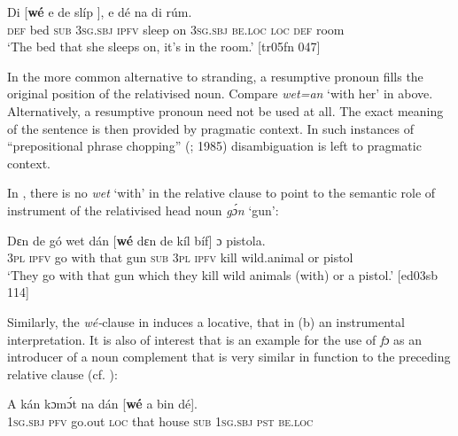 \ea%
    \label{ex:key:1437}
    \gll Di    [\textbf{wé}  e    de  slíp    ],  e    dé    na  di  rúm.\\
\textsc{def} bed \textsc{sub} \textsc{3sg.sbj}  \textsc{ipfv} sleep  on  \textsc{3sg.sbj}  \textsc{be.loc}  \textsc{loc}  \textsc{def}  room\\

\glt ‘The bed that she sleeps on, it’s in the room.’ [tr05fn 047]
\z

In the more common alternative to stranding, a resumptive pronoun fills the original position of the relativised noun. Compare \textit{wet=an} ‘with her’ in  above. Alternatively, a resumptive pronoun need not be used at all. The exact meaning of the sentence is then provided by pragmatic context. In such instances of “prepositional phrase chopping” (\citealt{Tarallo1983}; 1985) disambiguation is left to pragmatic context. 


In , there is no \textit{wet} ‘with’ in the relative clause to point to the semantic role of instrument of the relativised head noun \textit{gɔ́n} ‘gun’:



\ea%
    \label{ex:key:1438}
    \gll Dɛn  de  gó  wet    dán      [\textbf{wé}  dɛn  de  kíl  bíf]      ɔ  pistola.\\
\textsc{3pl}  \textsc{ipfv}  go  with    that    gun   \textsc{sub}  \textsc{3pl}  \textsc{ipfv}  kill  wild.animal  or  pistol\\

\glt ‘They go with that gun which they kill wild animals (with) or a pistol.’ [ed03sb 114]
\z

Similarly, the \textit{wé-}clause in  induces a locative, that in (b) an instrumental interpretation. It is also of interest that  is an example for the use of \textit{fɔ} as an introducer of a noun complement that is very similar in function to the preceding relative clause (cf. ): 


\ea%
    \label{ex:key:1439}
    \gll A    kán  kɔmɔ́t  na  dán      [\textbf{wé}    a    bin  dé].\\
\textsc{1sg.sbj}  \textsc{pfv}  go.out  \textsc{loc}  that  house   \textsc{sub}    \textsc{1sg.sbj}  \textsc{pst}  \textsc{be.loc}\\

